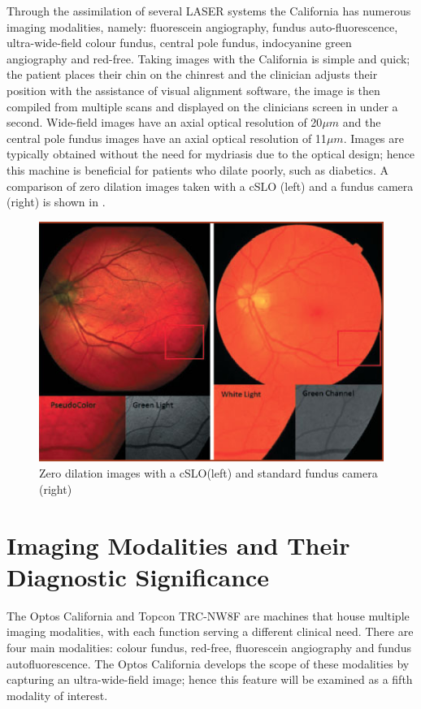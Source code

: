 Through the assimilation of several LASER systems the California has numerous
imaging modalities, namely: fluorescein angiography, fundus auto-fluorescence,
ultra-wide-field colour fundus, central pole fundus, indocyanine green
angiography and red-free.\cite{7_burnett_hodd_2012} Taking images with the
California is simple and quick; the patient places their chin on the chinrest
and the clinician adjusts their position with the assistance of visual alignment
software, the image is then compiled from multiple scans and displayed on the
clinicians screen in under a second. Wide-field images have an axial optical
resolution of 20$\mu m$ and the central pole fundus images have an axial
optical resolution of 11$\mu m$. Images are typically obtained without the
need for mydriasis due to the optical design; hence this machine is beneficial
for patients who dilate poorly, such as diabetics. A comparison of zero dilation
\cite{11_de_brouwere_2013} images taken with a cSLO (left) and a fundus
camera (right) is shown in . 

\begin{figure}[htbp]
\centering
\includegraphics{figures/zerodilation}
\caption{Zero dilation images with a cSLO(left) and standard fundus camera (right)\cite{11_de_brouwere_2013}}
\label{fig:zero}
   \end{figure}


\section{Imaging Modalities and Their Diagnostic Significance}

The Optos California and Topcon TRC-NW8F are machines that house multiple
imaging modalities, with each function serving a different clinical need.
There are four main modalities: colour fundus, red-free, fluorescein angiography
and fundus autofluorescence. The Optos California develops the scope of these
modalities by capturing an ultra-wide-field image; hence this feature will be
examined as a fifth modality of interest.


